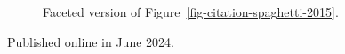 \documentclass[
  10pt,
  letterpaper,
  DIV=11,
  numbers=noendperiod,
  twoside]{scrartcl}
\begin{document}
\begin{figure}


\caption{\label{fig-citation-facet-2015}Faceted version of
Figure~\ref{fig-citation-spaghetti-2015}.}

\end{figure}%

\newpage



\noindent Published online in June 2024.
\end{document}
